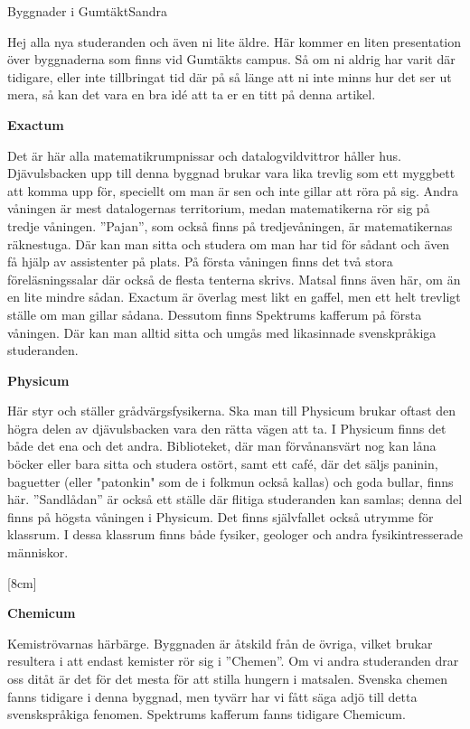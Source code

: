 \documentclass{spektraklet}
\begin{document}
\begin{artikel}{Byggnader i Gumtäkt}{Sandra}

Hej alla nya studeranden och även ni lite äldre. Här kommer en liten presentation över
byggnaderna som finns vid Gumtäkts campus. Så om ni aldrig har varit där tidigare,
eller inte tillbringat tid där på så länge att ni inte minns hur det ser ut mera, så kan
det vara en bra idé att ta er en titt på denna artikel.

\textbf{Exactum}

Det är här alla matematikrumpnissar och datalogvildvittror håller hus. Djävulsbacken upp
till denna byggnad brukar vara lika trevlig som ett myggbett att komma upp för, speciellt om
man är sen och inte gillar att röra på sig. Andra våningen är mest datalogernas territorium,
medan matematikerna rör sig på tredje våningen. ”Pajan”, som också finns på tredjevåningen,
är matematikernas räknestuga. Där kan man sitta och studera om man har tid för sådant och
även få hjälp av assistenter på plats. På första våningen finns det två stora föreläsningssalar där också de flesta tenterna skrivs. Matsal finns även här, om än en lite mindre sådan. Exactum är överlag mest likt en gaffel, men ett helt trevligt ställe om man gillar sådana. Dessutom finns Spektrums kafferum på första våningen. Där kan man alltid sitta och umgås med likasinnade svenskpråkiga studeranden.



\textbf{Physicum}

Här styr och ställer grådvärgsfysikerna. Ska man till Physicum brukar oftast den högra
delen av djävulsbacken vara den rätta vägen att ta. I Physicum finns det både det ena och det andra. Biblioteket, där man förvånansvärt nog kan låna böcker eller bara sitta och studera ostört, samt ett café, där det säljs paninin, baguetter (eller "patonkin" som de i folkmun också kallas) och goda bullar, finns här. ”Sandlådan” är också ett ställe där flitiga studeranden kan samlas; denna del finns på högsta våningen i Physicum. Det finns självfallet också utrymme för klassrum. I dessa klassrum finns både fysiker, geologer och andra fysikintresserade människor.

[8cm]

\textbf{Chemicum}

Kemiströvarnas härbärge. Byggnaden är åtskild från de övriga, vilket brukar resultera i att
endast kemister rör sig i ”Chemen”. Om vi andra studeranden drar oss ditåt är det för det
mesta för att stilla hungern i matsalen. Svenska chemen fanns tidigare i denna byggnad, men
tyvärr har vi fått säga adjö till detta svenskspråkiga fenomen. Spektrums kafferum fanns
tidigare Chemicum.


\end{artikel}
\end{document}
